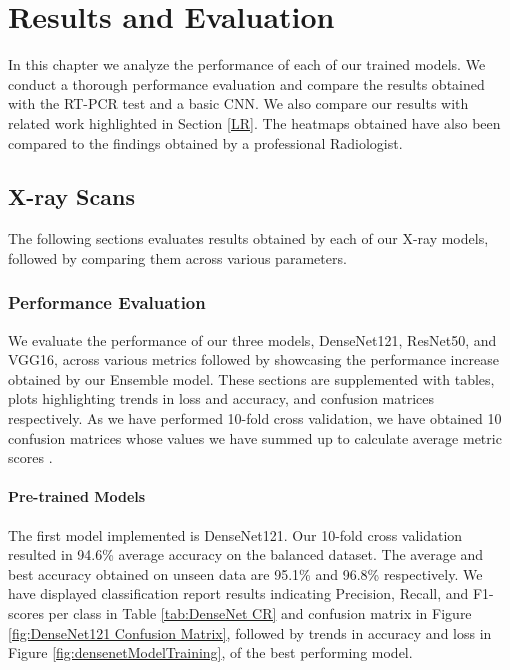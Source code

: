 \chapter{Results and Evaluation} \label{Results and Evaluation}

In this chapter we analyze the performance of each of our trained models. We conduct a thorough performance evaluation and compare the results obtained with the RT-PCR test and a basic CNN. We also compare our results with related work highlighted in Section \ref{LR}. The heatmaps obtained have also been compared to the findings obtained by a professional Radiologist. 


\section{X-ray Scans}
The following sections evaluates results obtained by each of our X-ray models, followed by comparing them across various parameters.
\subsection{Performance Evaluation}
We evaluate the performance of our three models, DenseNet121, ResNet50, and VGG16, across various metrics followed by showcasing the performance increase obtained by our Ensemble model. These sections are supplemented with tables, plots highlighting trends in loss and accuracy, and confusion matrices respectively. As we have performed 10-fold cross validation, we have obtained 10 confusion matrices whose values we have summed up to calculate average metric scores \cite{RGC2016}.
\subsubsection{Pre-trained Models} \label{ptmXray}

The first model implemented is DenseNet121. Our 10-fold cross validation resulted in 94.6\% average accuracy on the balanced dataset. The average and best accuracy obtained on unseen data are 95.1\% and 96.8\% respectively. We have displayed classification report results indicating Precision, Recall, and F1-scores per class in Table \ref{tab:DenseNet CR} and confusion matrix in Figure \ref{fig:DenseNet121 Confusion Matrix},  followed by trends in accuracy and loss in Figure \ref{fig:densenetModelTraining}, of the best performing model.

